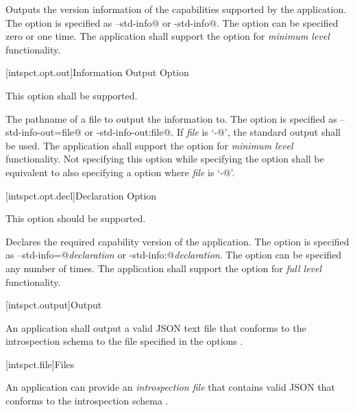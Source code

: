\pnum
{}
\begin{indented}
	Outputs the version information of the capabilities supported by the
	application.
	The option is specified as \verb@--std-info@ or \verb@-std-info@.
	The option can be specified zero or one time.
	The application shall support the option for \emph{minimum level}
	 functionality.
\end{indented}

[intspct.opt.out]{Information Output Option}

\pnum
This option shall be supported.

\pnum
{} 
\begin{indented}
	The pathname of a file to output the information to.
	The option is specified as \verb@--std-info-out=file@ or
	\verb@-std-info-out:file@.
	If \emph{file} is ‘\verb@-@’, the standard output shall be used.
	The application shall support the option for \emph{minimum level}
	 functionality.
	Not specifying this option while specifying the
	 option  shall be
	equivalent to also specifying a 
	 option where \emph{file} is ‘\verb@-@’.
\end{indented}

[intspct.opt.decl]{Declaration Option}

\pnum
This option should be supported.

\pnum
{} 
\begin{indented}
	Declares the required capability version of the application.
	The option is specified as \verb@--std-info=@\emph{declaration} or
	\verb@-std-info:@\emph{declaration}.
	The option can be specified any number of times.
	The application shall support the option for \emph{full level}
	 functionality.
\end{indented}

[intspct.output]{Output}

\pnum
An application shall output a valid JSON text file that conforms to the
introspection schema  to the file specified in the options
.

[intspct.file]{Files}

\pnum
An application can provide an \emph{introspection file} that contains valid
JSON that conforms to the introspection schema .

